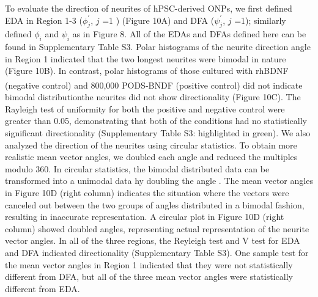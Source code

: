 \documentclass[review]{elsarticle}
\begin{document}
To evaluate the direction of neurites of hPSC-derived ONPs, we first defined EDA in Region 1-3 ($\phi^{\prime}_{j}$, $j$ =1 ) (Figure 10A) and DFA ($\psi^{\prime}_{j}$, $j$ =1); similarly defined $\phi_{i}$ and $\psi_{i}$ as in Figure 8. All of the EDAs and DFAs defined here can be found in Supplementary Table S3. Polar histograms of the neurite direction angle in Region 1 indicated that the two longest neurites were bimodal in nature (Figure 10B).  In contrast, polar histograms of those cultured with rhBDNF (negative control) and 800,000 PODS\textsuperscript{\textregistered}-BNDF (positive control) did not indicate bimodal distribution\textemdash the neurites did not show directionality (Figure 10C). The Rayleigh test of uniformity for both the positive and negative control were greater than 0.05, demonstrating that both of the conditions had no statistically significant directionality (Supplementary Table S3: highlighted in green). We also analyzed the direction of the neurites using circular statistics. To obtain more realistic mean vector angles, we doubled each angle and reduced the multiples modulo 360\degree. In circular statistics, the bimodal distributed data can be transformed into a unimodal data hy doubling the angle \cite{Batschelet1981}. The mean vector angles in Figure 10D (right column) indicates the situation where the vectors were canceled out between the two groups of angles distributed in a bimodal fashion, resulting in inaccurate representation. A circular plot in Figure 10D (right column) showed doubled angles, representing actual representation of the neurite vector angles. In all of the three regions, the Reyleigh test and V test for EDA and DFA indicated directionality (Supplementary Table S3). One sample test for the mean vector angles in Region 1 indicated that they were not statistically different from DFA, but all of the three mean vector angles were statistically different from EDA. 
\end{document}
